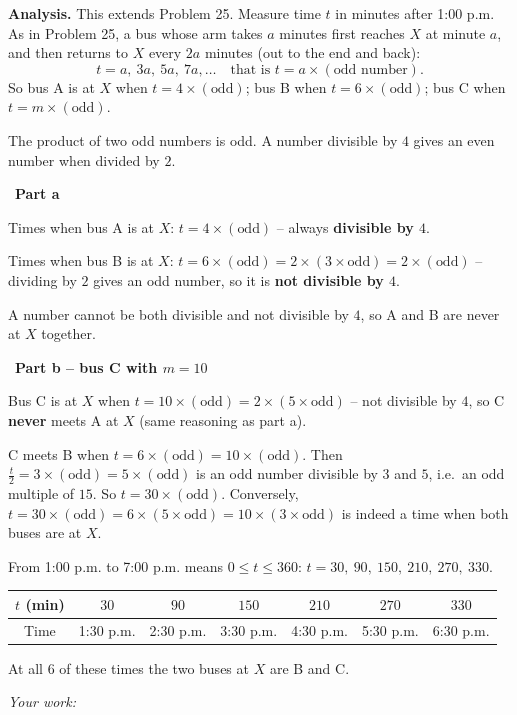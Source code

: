 \documentclass[11pt]{article}
\newif\ifsol \solfalse
\newcommand{\probsol}[1]{%
  \begin{lrbox}{\solmeasure}\begin{minipage}{\dimexpr\linewidth-24pt\relax}#1\end{minipage}\end{lrbox}%
  \ifsol
    \begin{solbox}#1\end{solbox}%
  \else
    \setlength{\solht}{\dimexpr\ht\solmeasure+\dp\solmeasure+0.85cm\relax}%
    \ifdim\solht<1.35cm\setlength{\solht}{1.35cm}\fi
    \ifdim\solht>\StudentMaxWork\setlength{\solht}{\StudentMaxWork}\fi
    \begin{tcolorbox}[colback=white,colframe=Line,boxrule=0.8pt,arc=5pt,
      left=8pt,right=8pt,top=4pt,bottom=4pt,height=\solht]{\footnotesize\color{Slate}\itshape\WorkWord}\end{tcolorbox}%
  \fi}
\newlength{\StudentMaxWork}\setlength{\StudentMaxWork}{7.5cm}
\newcommand{\step}[2]{\par\smallskip\noindent{\bfseries\color{tmBlue!85!black}\StepWord~#1.}\ {\bfseries #2}\par\nopagebreak}
\def\WorkWord{Your work:}
\def\StepWord{Step}
\begin{document}
\probsol{
\textbf{Analysis.} This extends Problem 25. Measure time $t$ in minutes after 1:00 p.m. As in Problem 25, a bus whose arm takes $a$ minutes first reaches $X$ at minute $a$, and then returns to $X$ every $2a$ minutes (out to the end and back):
\[ t=a,\ 3a,\ 5a,\ 7a,\dots \quad\text{that is } t=a\times(\text{odd number}). \]
So bus A is at $X$ when $t=4\times(\text{odd})$; bus B when $t=6\times(\text{odd})$; bus C when $t=m\times(\text{odd})$.
\begin{recallbox}The product of two odd numbers is odd. A number divisible by $4$ gives an even number when divided by $2$.\end{recallbox}

\step{1}{Part a}
Times when bus A is at $X$: $t=4\times(\text{odd})$ -- always \textbf{divisible by $4$}.\par
Times when bus B is at $X$: $t=6\times(\text{odd})=2\times(3\times\text{odd})=2\times(\text{odd})$ -- dividing by $2$ gives an odd number, so it is \textbf{not divisible by $4$}.\par
A number cannot be both divisible and not divisible by $4$, so A and B are never at $X$ together.

\step{2}{Part b -- bus C with $m=10$}
Bus C is at $X$ when $t=10\times(\text{odd})=2\times(5\times\text{odd})$ -- not divisible by $4$, so C \textbf{never} meets A at $X$ (same reasoning as part a).\par
C meets B when $t=6\times(\text{odd})=10\times(\text{odd})$. Then $\frac{t}{2}=3\times(\text{odd})=5\times(\text{odd})$ is an odd number divisible by $3$ and $5$, i.e.\ an odd multiple of $15$. So $t=30\times(\text{odd})$. Conversely, $t=30\times(\text{odd})=6\times(5\times\text{odd})=10\times(3\times\text{odd})$ is indeed a time when both buses are at $X$.\par
From 1:00 p.m. to 7:00 p.m. means $0\le t\le 360$: $t=30,\ 90,\ 150,\ 210,\ 270,\ 330$.
\begin{center}
\begin{tabular}{|c|c|c|c|c|c|c|}
\hline
\rowcolor{tmBlue!10}$t$ (min) & $30$ & $90$ & $150$ & $210$ & $270$ & $330$\\ \hline
Time & 1:30 p.m. & 2:30 p.m. & 3:30 p.m. & 4:30 p.m. & 5:30 p.m. & 6:30 p.m.\\ \hline
\end{tabular}
\end{center}
At all $6$ of these times the two buses at $X$ are B and C.

}
\end{document}
